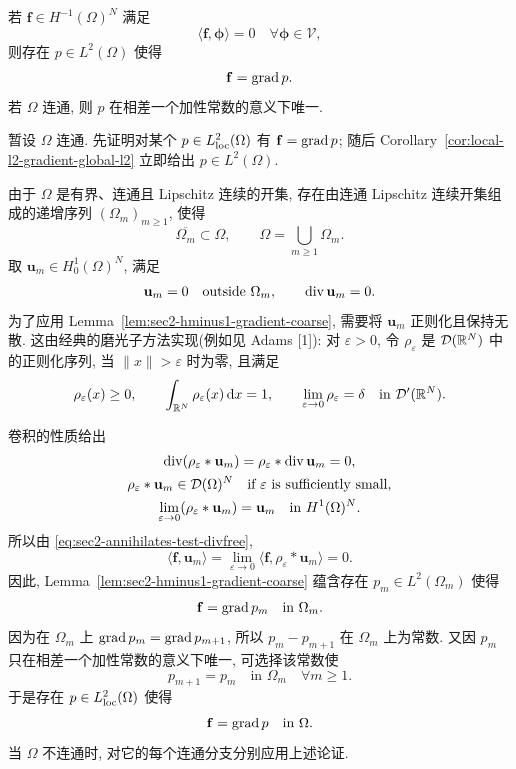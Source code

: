 \setcounter{statement}{2}
\begin{Theorem}\label{thm:sec2-gradient-characterization}
若 $\mathbf f\in H^{-1}(\Omega)^N$ 满足
\begin{equation}\label{eq:sec2-annihilates-test-divfree}
  \langle\mathbf f,\boldsymbol\phi\rangle=0
  \quad\forall\boldsymbol\phi\in\mathcal V,
\end{equation}
则存在 $p\in L^2(\Omega)$ 使得
\[
  \mathbf f=\operatorname{grad} p.
\]
若 $\Omega$ 连通, 则 $p$ 在相差一个加性常数的意义下唯一.
\end{Theorem}
\begin{Proof}
暂设 $\Omega$ 连通. 先证明对某个 $p\in L_{\mathrm{loc}}^2(\Omega)$ 有
$\mathbf f=\operatorname{grad} p$; 随后 Corollary~\ref{cor:local-l2-gradient-global-l2}
立即给出 $p\in L^2(\Omega)$.

由于 $\Omega$ 是有界、连通且 Lipschitz 连续的开集, 存在由连通 Lipschitz 连续开集组成的递增序列
$(\Omega_m)_{m\ge1}$, 使得
\[
  \overline{\Omega_m}\subset\Omega,
  \qquad \Omega=\bigcup_{m\ge1}\Omega_m.
\]
取 $\mathbf u_m\in H_0^1(\Omega)^N$, 满足
\[
  \mathbf u_m=0\quad\text{outside }\Omega_m,
  \qquad \operatorname{div}\mathbf u_m=0.
\]
为了应用 Lemma~\ref{lem:sec2-hminus1-gradient-coarse}, 需要将
$\mathbf u_m$ 正则化且保持无散. 这由经典的磨光子方法实现(例如见 Adams [1]):
对 $\varepsilon>0$, 令 $\rho_\varepsilon$ 是 $\mathcal{D}(\mathbb{R}^N)$ 中的正则化序列,
当 $\|x\|>\varepsilon$ 时为零, 且满足
\[
  \rho_\varepsilon(x)\ge0,
  \qquad\int_{\mathbb{R}^N}\rho_\varepsilon(x)\,\mathrm{d} x=1,
  \qquad\lim_{\varepsilon\to0}\rho_\varepsilon=\delta
  \quad\text{in }\mathcal{D}'(\mathbb{R}^N).
\]

卷积的性质给出
\[
\begin{gathered}
  \operatorname{div}(\rho_\varepsilon*\mathbf u_m)
  =\rho_\varepsilon*\operatorname{div}\mathbf u_m=0,\\
  \rho_\varepsilon*\mathbf u_m\in\mathcal{D}(\Omega)^N
  \quad\text{if }\varepsilon\text{ is sufficiently small},\\
  \lim_{\varepsilon\to0}(\rho_\varepsilon*\mathbf u_m)
  =\mathbf u_m\quad\text{in }H^1(\Omega)^N.
\end{gathered}
\]
所以由 \eqref{eq:sec2-annihilates-test-divfree},
\[
  \langle\mathbf f,\mathbf u_m\rangle
  =\lim_{\varepsilon\to0}\langle\mathbf f,\rho_\varepsilon*\mathbf u_m\rangle=0.
\]
因此, Lemma~\ref{lem:sec2-hminus1-gradient-coarse} 蕴含存在
$p_m\in L^2(\Omega_m)$ 使得
\[
  \mathbf f=\operatorname{grad} p_m\quad\text{in }\Omega_m.
\]
因为在 $\Omega_m$ 上 $\operatorname{grad} p_m=\operatorname{grad} p_{m+1}$, 所以 $p_m-p_{m+1}$ 在
$\Omega_m$ 上为常数. 又因 $p_m$ 只在相差一个加性常数的意义下唯一, 可选择该常数使
\[
  p_{m+1}=p_m\quad\text{in }\Omega_m\quad\forall m\ge1.
\]
于是存在 $p\in L_{\mathrm{loc}}^2(\Omega)$ 使得
\[
  \mathbf f=\operatorname{grad} p\quad\text{in }\Omega.
\]
当 $\Omega$ 不连通时, 对它的每个连通分支分别应用上述论证.
\end{Proof}

